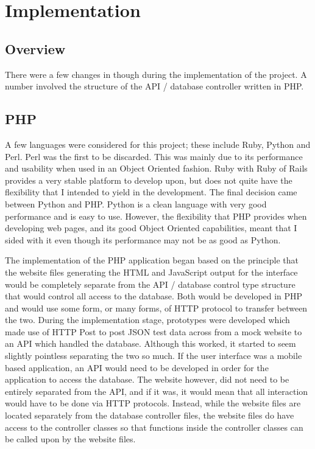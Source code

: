 \chapter{Implementation}

\section{Overview}
	There were a few changes in though during the implementation of the project. A number involved the structure of the API / database controller written in PHP. 
	
\section{PHP}
	A few languages were considered for this project; these include Ruby, Python and Perl. Perl was the first to be discarded. This was mainly due to its performance and usability when used in an Object Oriented fashion. Ruby with Ruby of Rails provides a very stable platform to develop upon, but does not quite have the flexibility that I intended to yield in the development. The final decision came between Python and PHP. Python is a clean language with very good performance and is easy to use. However, the flexibility that PHP provides when developing web pages, and its good Object Oriented capabilities, meant that I sided with it even though its performance may not be as good as Python.
	
	The implementation of the PHP application began based on the principle that the website files generating the HTML and JavaScript output for the interface would be completely separate from the API / database control type structure that would control all access to the database. Both would be developed in PHP and would use some form, or many forms, of HTTP protocol to transfer between the two. During the implementation stage, prototypes were developed which made use of HTTP Post to post JSON test data across from a mock website to an API which handled the database. Although this worked, it started to seem slightly pointless separating the two so much. If the user interface was a mobile based application, an API would need to be developed in order for the application to access the database. The website however, did not need to be entirely separated from the API, and if it was, it would mean that all interaction would have to be done via HTTP protocols. Instead, while the website files are located separately from the database controller files, the website files do have access to the controller classes so that functions inside the controller classes can be called upon by the website files. 
	
